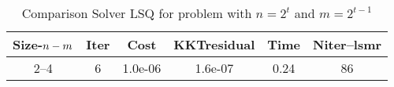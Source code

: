 \documentclass[letterpaper,12pt,oneside,final]{book}
\begin{document}
\begin{table}
\caption{ Comparison Solver LSQ  for  problem with $n=2^{t}$ and $m=2^{t-1}$  } 
\begin{center}
\begin{tabular}{|*{6}{c}|} \hline
Size-$n\--m$ & \multicolumn{1}{c}{Iter} & \multicolumn{1}{c}{Cost}& \multicolumn{1}{c}{KKTresidual} & \multicolumn{1}{c}{Time} & \multicolumn{1}{c|}{Niter--lsmr} \\ 
\hline

2--4           &6    &1.0e-06        &1.6e-07        &0.24           &86   \\ 

\hline
\end{tabular}
\end{center}
\end{table}
\end{document}
